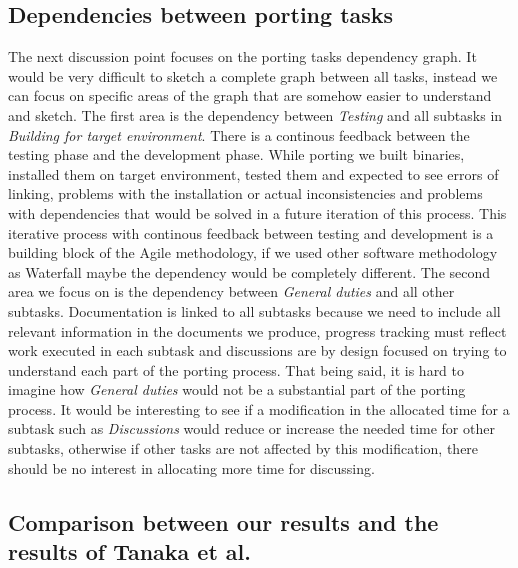 \subsection{Dependencies between porting tasks}

The next discussion point focuses on the porting tasks dependency graph. It
would be very difficult to sketch a complete graph between all tasks, instead we
can focus on specific areas of the graph that are somehow easier to understand
and sketch. The first area is the dependency between \textit{Testing} and all
subtasks in \textit{Building for target environment}. There is a continous
feedback between the testing phase and the development phase. While porting we
built binaries, installed them on target environment, tested them and expected
to see errors of linking, problems with the installation or actual
inconsistencies and problems with dependencies that would be solved in a future
iteration of this process. This iterative process with continous feedback
between testing and development is a building block of the Agile methodology, if
we used other software methodology as Waterfall maybe the dependency would be
completely different. The second area we focus on is the dependency between
\textit{General duties} and all other subtasks. Documentation is linked to all
subtasks because we need to include all relevant information in the documents we
produce, progress tracking must reflect work executed in each subtask and
discussions are by design focused on trying to understand each part of the
porting process. That being said, it is hard to imagine how \textit{General
duties} would not be a substantial part of the porting process. It would be
interesting to see if a modification in the allocated time for a subtask such
as \textit{Discussions} would reduce or increase the needed time for other
subtasks, otherwise if other tasks are not affected by this modification, there
should be no interest in allocating more time for discussing.

\subsection{Comparison between our results and the results of Tanaka et al.}

